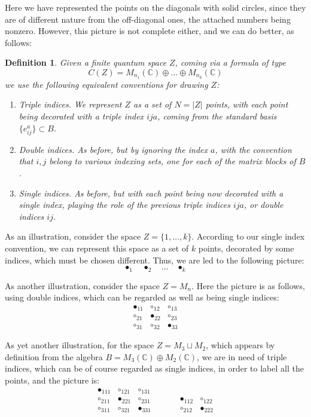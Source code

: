 \documentclass[12pt]{amsbook}
\newtheorem{definition}[theorem]{Definition}
\begin{document}
Here we have represented the points on the diagonals with solid circles, since they are of different nature from the off-diagonal ones, the attached numbers being nonzero. However, this picture is not complete either, and we can do better, as follows:

\begin{definition}
Given a finite quantum space $Z$, coming via a formula of type
$$C(Z)=M_{n_1}(\mathbb C)\oplus\ldots\oplus M_{n_k}(\mathbb C)$$
we use the following equivalent conventions for drawing $Z$:
\begin{enumerate}
\item Triple indices. We represent $Z$ as a set of $N=|Z|$ points, with each point being decorated with a triple index $ija$, coming from the standard basis $\{e_{ij}^a\}\subset B$. 

\item Double indices. As before, but by ignoring the index $a$, with the convention that $i,j$ belong to various indexing sets, one for each of the matrix blocks of $B$.

\item Single indices. As before, but with each point being now decorated with a single index, playing the role of the previous triple indices $ija$, or double indices $ij$.
\end{enumerate}
\end{definition}

As an illustration, consider the space $Z=\{1,\ldots,k\}$. According to our single index convention, we can represent this space as a set of $k$ points, decorated by some indices, which must be chosen different. Thus, we are led to the following picture:
$$\bullet_1\quad\bullet_2\quad\ldots\quad\bullet_k$$

As another illustration, consider the space $Z=M_n$. Here the picture is as follows, using double indices, which can be regarded as well as being single indices:
$$\begin{matrix}
\bullet_{11}&\circ_{12}&\circ_{13}\\
\circ_{21}&\bullet_{22}&\circ_{23}\\
\circ_{31}&\circ_{32}&\bullet_{33}
\end{matrix}$$

\smallskip

As yet another illustration, for the space $Z=M_3\sqcup M_2$, which appears by definition from the algebra $B=M_3(\mathbb C)\oplus M_2(\mathbb C)$, we are in need of triple indices, which can be of course regarded as single indices, in order to label all the points, and the picture is:
$$\begin{matrix}
\bullet_{111}&\circ_{121}&\circ_{131}\\
\circ_{211}&\bullet_{221}&\circ_{231}&&\ &&\bullet_{112}&\circ_{122}\\
\circ_{311}&\circ_{321}&\bullet_{331}&&&&\circ_{212}&\bullet_{222}
\end{matrix}$$
\end{document}
